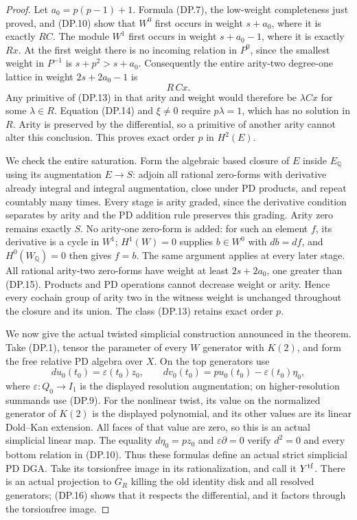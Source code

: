 \begin{proof}
Let $a_0=p(p-1)+1$. Formula (DP.7), the low-weight
completeness just proved, and (DP.10) show that $W^0$
first occurs in weight $s+a_0$, where it is exactly
$RC$. The module $W^1$ first occurs in weight $s+a_0-1$,
where it is exactly $Rx$. At the first weight there is
no incoming relation in $P^0$, since the smallest
weight in $P^{-1}$ is $s+p^2>s+a_0$.
Consequently the entire arity-two degree-one lattice
in weight $2s+2a_0-1$ is
\[
                                 R\,Cx.             \tag{DP.15}
\]
Any primitive of (DP.13) in that arity and weight would
therefore be $\lambda Cx$ for some $\lambda\in R$.
Equation (DP.14) and $\xi\ne0$ require $p\lambda=1$,
which has no solution in $R$.
Arity is preserved by the differential, so a primitive
of another arity cannot alter this conclusion.
This proves exact order $p$ in $H^2(E)$.

We check the entire saturation. Form the algebraic
based closure of $E$ inside $E_{\mathbb Q}$ using its
augmentation $E\to S$: adjoin all rational zero-forms
with derivative already integral and integral augmentation,
close under PD products, and repeat countably many times.
Every stage is arity graded, since the derivative condition
separates by arity and the PD addition rule preserves
this grading. Arity zero remains exactly $S$.
No arity-one zero-form is added: for such an element
$f$, its derivative is a cycle in $W^1$; $H^1(W)=0$
supplies $b\in W^0$ with $db=df$, and
$H^0(W_{\mathbb Q})=0$ then gives $f=b$.
The same argument applies at every later stage.
All rational arity-two zero-forms have weight at least
$2s+2a_0$, one greater than (DP.15).
Products and PD operations cannot decrease weight or
arity. Hence every cochain group of arity two in the
witness weight is unchanged throughout the closure
and its union. The class (DP.13) retains exact order $p$.

We now give the actual twisted simplicial construction
announced in the theorem. Take (DP.1), tensor the parameter
of every $W$ generator with $K(2)$, and form the free
relative PD algebra over $X$. On the top generators use
\[
 du_0(t_0)=\varepsilon(t_0)z_0,\qquad
 dv_0(t_0)=p u_0(t_0)-\varepsilon(t_0)\eta_0,
 \tag{DP.16}
\]
where $\varepsilon:Q_0\to I_1$ is the displayed resolution
augmentation; on higher-resolution summands use (DP.9).
For the nonlinear twist, its value on the normalized
generator of $K(2)$ is the displayed polynomial, and
its other values are its linear Dold--Kan extension.
All faces of that value are zero, so this is an actual
simplicial linear map. The equality $d\eta_0=pz_0$ and
$\varepsilon\partial=0$ verify $d^2=0$ and every bottom
relation in (DP.10). Thus these formulas define an
actual strict simplicial PD DGA. Take its torsionfree
image in its rationalization, and call it $Y^{\rm tf}$.
There is an actual projection to $G_R$ killing the old
identity disk and all resolved generators; (DP.16)
shows that it respects the differential, and it factors
through the torsionfree image.


\end{proof}
